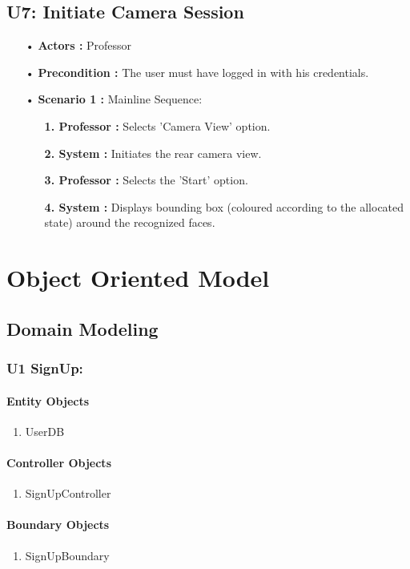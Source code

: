 \documentclass{scrreprt}
\begin{document}
\section{U7: Initiate Camera Session}
\begin{itemize}
\item [•] \textbf{Actors :} Professor
\item[•] \textbf{Precondition :} The user must have logged in with his credentials.
\item [•] \textbf{Scenario 1 :} Mainline Sequence:
\begin{itemize}
\item [] \textbf{1. Professor :} Selects 'Camera View' option.
\item [] \textbf{2. System :} Initiates the rear camera view.
\item [] \textbf{3. Professor :} Selects the 'Start' option.
\item [] \textbf{4. System :} Displays bounding box (coloured according to the allocated state) around the recognized faces.
\end{itemize}
\end{itemize}


\chapter{Object Oriented Model}
\section{Domain Modeling}
\subsection{U1 SignUp:}
\subsubsection{Entity Objects}
\begin{enumerate}
  \item UserDB
\end{enumerate}
\subsubsection{Controller Objects}
\begin{enumerate}
  \item SignUpController
\end{enumerate}
\subsubsection{Boundary Objects}
\begin{enumerate}
  \item SignUpBoundary
\end{enumerate}
\end{document}
